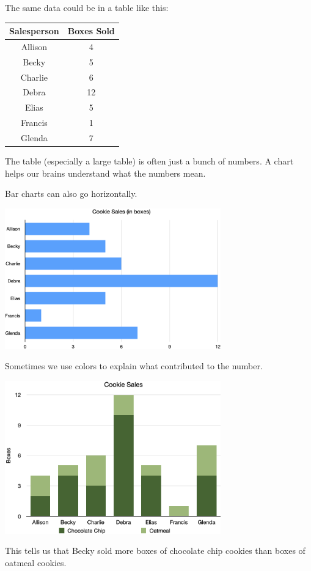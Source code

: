 The same data could be in a table like this:

\begin{tabular}{c | c}
  Salesperson & Boxes Sold \\
  \hline
  Allison & 4 \\
  Becky & 5 \\
  Charlie & 6\\
  Debra & 12\\
  Elias & 5\\
  Francis & 1\\
  Glenda & 7
\end{tabular}

The table (especially a large table) is often just a bunch of
numbers. A chart helps our brains understand what the numbers mean.

Bar charts can also go horizontally.

\includegraphics[width=0.7\textwidth]{HorizontalBarCookies.png}

Sometimes we use colors to explain what contributed to the number.

\includegraphics[width=0.7\textwidth]{TypesCookieBar.png}

This tells us that Becky sold more boxes of chocolate chip cookies
than boxes of oatmeal cookies.

